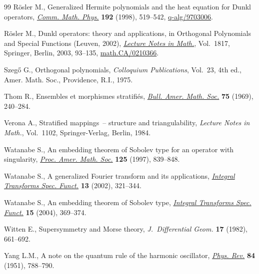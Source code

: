 \documentclass[11pt]{article}
\begin{document}
\begin{thebibliography}{99}
R{\"o}sler M., Generalized {H}ermite polynomials and the heat equation for
  {D}unkl operators, \href{http://dx.doi.org/10.1007/s002200050307}{\textit{Comm. Math. Phys.}} \textbf{192} (1998), 519--542,
  \href{http://arxiv.org/abs/q-alg/9703006}{q-alg/9703006}.

R{\"o}sler M., Dunkl operators: theory and applications, in Orthogonal
  Polynomials and Special Functions ({L}euven, 2002), \href{http://dx.doi.org/10.1007/3-540-44945-0_3}{\textit{Lecture Notes in
  Math.}}, Vol.~1817, Springer, Berlin, 2003, 93--135,
  \href{http://arxiv.org/abs/math.CA/0210366}{math.CA/0210366}.

Szeg{\H{o}} G., Orthogonal polynomials, \textit{Colloquium Publications},
  Vol.~23, 4th ed., Amer. Math. Soc., Providence, R.I., 1975.

Thom R., Ensembles et morphismes stratif\/i\'es, \href{http://dx.doi.org/10.1090/S0002-9904-1969-12138-5}{\textit{Bull. Amer. Math. Soc.}}
  \textbf{75} (1969), 240--284.

Verona A., Stratif\/ied mappings~-- structure and triangulability,
  \textit{Lecture Notes in Math.}, Vol.~1102, Springer-Verlag, Berlin,
  1984.

Watanabe S., An embedding theorem of {S}obolev type for an operator with
  singularity, \href{http://dx.doi.org/10.1090/S0002-9939-97-03642-3}{\textit{Proc. Amer. Math. Soc.}} \textbf{125} (1997), 839--848.

Watanabe S., A generalized {F}ourier transform and its applications,
  \href{http://dx.doi.org/10.1080/10652460213521}{\textit{Integral Transforms Spec. Funct.}} \textbf{13} (2002), 321--344.

Watanabe S., An embedding theorem of {S}obolev type, \href{http://dx.doi.org/10.1080/1065246042000210403a}{\textit{Integral
  Transforms Spec. Funct.}} \textbf{15} (2004), 369--374.

Witten E., Supersymmetry and {M}orse theory, \textit{J.~Differential Geom.}
  \textbf{17} (1982), 661--692.

Yang L.M., A note on the quantum rule of the harmonic oscillator, \href{http://dx.doi.org/10.1103/PhysRev.84.788}{\textit{Phys.
  Rev.}} \textbf{84} (1951), 788--790.

\end{thebibliography}
\end{document}

